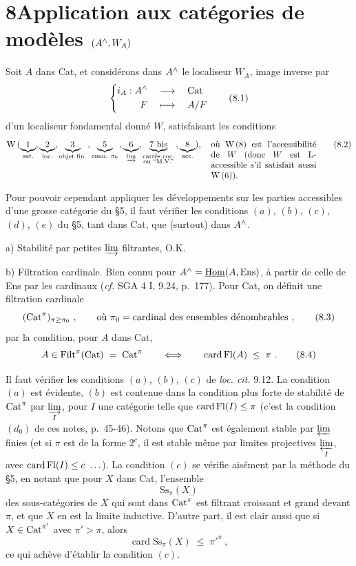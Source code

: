 \section*{8\quad Application aux catégories de modèles $(A^{\wedge},W_A)$}

Soit $A$ dans Cat, et considérons dans $A^{\wedge}$ le localiseur $W_A$, image inverse par
\[
\left\{
\begin{aligned}
i_A : A\chap \quad &\longrightarrow \quad \Cat\\
F \quad &\longmapsto \quad A/F
\end{aligned}
\right.
\tag*{(8.1)}
\]
d'un localiseur fondamental donné $W$, satisfaisant les conditions
\[
\mathrm{W}\,(\underbrace{1}_{\text{sat.}},\underbrace{2}_{\text{loc.}},\underbrace{3}_{\text{objet fin.}}\,,\underbrace{5}_{\text{conn. }\pi_0}\,,\underbrace{6}_{\varinjlim},\underbrace{7\text{ bis}}_{\substack{\text{carrés coc.}\\ \text{ou ``M.V.''}}}\,,\underbrace{8}_{\text{acc.}}),\quad
\text{\parbox[t]{4.3cm}{où W\,(8) est l'accessibilité de $W$ (donc $W$ est L-accessible s'il satisfait aussi W\,(6)).}}
\tag*{(8.2)}
\]

Pour pouvoir cependant appliquer les développements sur les parties accessibles d'une grosse catégorie du §5, il faut vérifier les conditions $(a)$, $(b)$, $(c)$, $(d)$, $(e)$ du §5, tant dans Cat, que (surtout) dans $A^{\wedge}$.

a) Stabilité par petites $\varinjlim$ filtrantes, O.K.

b) Filtration cardinale. Bien connu pour $A^{\wedge} = \underline{\mathrm{Hom}}(A,\mathrm{Ens})$, à partir de celle de Ens par les cardinaux (\textit{cf.} SGA 4 I, 9.24, p.~177). Pour Cat, on définit une filtration cardinale
\[
(\Cat^{\pi})_{\pi\geq\pi_0}\ , \qquad \text{où } \pi_0 = \text{cardinal des ensembles dénombrables}\ ,
\tag*{(8.3)}
\]
par la condition, pour $A$ dans Cat,
\[
A\in \mathrm{Filt}^{\pi}(\Cat) \;=\; \Cat^{\pi} \qquad\Longleftrightarrow\qquad \operatorname{card}\Fl(A) \;\leq\; \pi\ .
\tag*{(8.4)}
\]

Il faut vérifier les conditions $(a)$, $(b)$, $(c)$ de \textit{loc. cit.} 9.12. La condition $(a)$ est évidente, $(b)$ est contenue dans la condition plus forte de stabilité de $\mathrm{Cat}^{\pi}$ par $\varinjlim\limits_{I}$, pour $I$ une catégorie telle que $\operatorname{card}\mathrm{Fl}(I)\leq\pi$ (c'est la condition $(d_0)$ de ces notes, p.~45-46). Notons que $\mathrm{Cat}^{\pi}$ est également stable par $\varprojlim$ finies (et si $\pi$ est de la forme $2^c$, il est stable même par limites projectives $\varprojlim\limits_{I}$, avec $\operatorname{card}\mathrm{Fl}(I)\leq c\ \ldots$). La condition $(c)$ se vérifie aisément par la méthode du §5, en notant que pour $X$ dans Cat, l'ensemble
\[
\mathrm{Ss}_{\pi}(X)
\]
des sous-catégories de $X$ qui sont dans $\mathrm{Cat}^{\pi}$ est filtrant croissant et grand devant $\pi$, et que $X$ en est la limite inductive. D'autre part, il est clair aussi que si $X\in\mathrm{Cat}^{\pi'}$ avec $\pi'>\pi$, alors
\[
\operatorname{card}\mathrm{Ss}_{\pi}(X) \;\leq\; \pi'^{\pi}\ ,
\]
ce qui achève d'établir la condition $(c)$.

